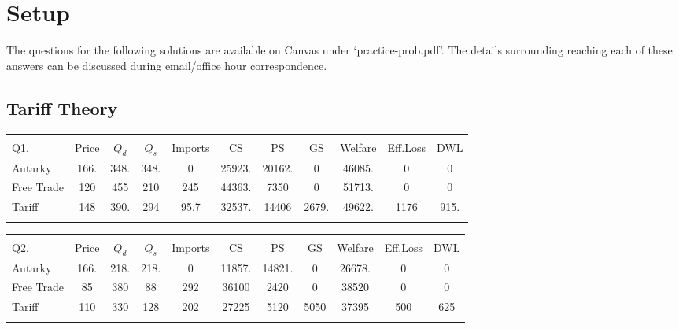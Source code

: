 \documentclass[12pt]{article}
\begin{document}
\singlespacing


\section*{Setup}

\noindent 
The questions for the following solutions are available on Canvas under `practice-prob.pdf'.
The details surrounding reaching each of these answers can be discussed during email/office hour correspondence.

\subsection*{Tariff Theory} 
\begin{table}[!h]
	\centering
	\begin{tabular}[t]{l c c c c c c c c c c }
		\hline
		&&&&&&&&&& \\
Q1. & Price & $Q_d$ & $Q_s$ & Imports & CS & PS & GS & Welfare & Eff.Loss & DWL \\
Autarky & 166.   &   348.  &  348.  &   0      &  25923.  &  20162.  &  0    & 46085.  &  0 &  0 \\
Free Trade & 120  & 455 & 210 & 245  & 44363. & 7350  & 0   & 51713. & 0 &  0 \\
Tariff &  148  &   390.      &  294    & 95.7 & 32537.  & 14406 &  2679. & 49622. & 1176 & 915.\\
&&&&&&&&&& \\
\hline
\end{tabular}
\end{table} 
\begin{table}[!h]
	\centering
	\begin{tabular}[t]{l c c c c c c c c c c }
		\hline
		&&&&&&&&&&  \\
	Q2.	& Price & $Q_d$ & $Q_s$ & Imports & CS & PS & GS & Welfare & Eff.Loss & DWL \\
Autarky &  166.& 218. &  218. & 0  & 11857. & 14821.   & 0 & 26678. & 0  & 0 \\
Free Trade &   85 & 380  & 88& 292 & 36100 & 2420  & 0  & 38520 & 0 & 0\\
Tariff &  110   &  330   &   128 & 202  & 27225  & 5120 & 5050 & 37395 & 500 & 625\\
&&&&&&&&&& \\
\hline
\end{tabular}
\end{table}
\end{document}
